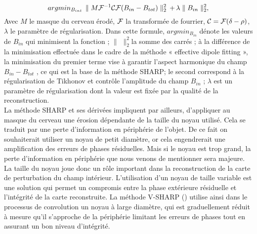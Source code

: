 {\begin{equation}
argmin_{B_{int}}\,\parallel M{\cal F}^{-1}{\cal C}{\cal F}(B_{in}-B_{tot})\parallel_2^2\,+\,\lambda\parallel B_{in}\parallel_2^2,
\end{equation}
Avec $M$ le masque du cerveau érodé, ${\cal F}$ la transformée de fourrier, ${\cal C} = {\cal F}(\delta-\rho)$, $\lambda$ le paramètre de
régularisation. Dans cette formule, $argmin_{B_{in}}$ dénote les valeurs de $B_{in}$ qui minimisent la fonction ; $\parallel\,\,\parallel_2^2$la somme des carrés ; à la différence de la minimisation effectuée dans le cadre de la méthode « effective dipole fitting », la minimisation du premier terme vise à garantir l’aspect harmonique du
champ $B_{in}-B_{tot}$ , ce qui est la base de la méthode SHARP; le second correspond à la régularisation
de Tikhonov et contrôle l’amplitude du champ $B_{in}$ ; $\lambda$ est un paramètre de régularisation dont la valeur
est fixée par la qualité de la reconstruction.\\
La méthode SHARP et ses dérivées impliquent par ailleurs, d’appliquer au masque du cerveau
une érosion dépendante de la taille du noyau utilisé. Cela se traduit par une perte d’information en
périphérie de l’objet. De ce fait on souhaiterait utiliser un noyau de petit diamètre, or cela engendrerait
une amplification des erreurs de phases résiduelles. Mais si le noyau est trop grand, la perte
d’information en périphérie que nous venons de mentionner sera majeure. La taille du noyau joue
donc un rôle important dans la reconstruction de la carte de perturbation du champ intérieur.
L’utilisation d’un noyau de taille variable est une solution qui permet un compromis entre la phase
extérieure résiduelle et l’intégrité de la carte reconstruite. La méthode V-SHARP (\cite{Wu2012}) utilise ainsi dans
le processus de convolution un noyau à large diamètre, qui est graduellement réduit à mesure qu’il
s’approche de la périphérie limitant les erreurs de phases tout en assurant un bon niveau d’intégrité.
}
